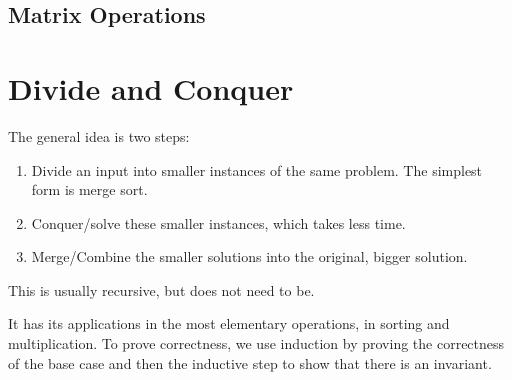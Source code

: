 \documentclass{article}
\begin{document}
  \subsection{Matrix Operations}

    \begin{definition}
      
    \end{definition}

    \begin{definition}
      
    \end{definition}

    \begin{definition}[QR Decomposition]
      
    \end{definition}

    \begin{definition}[LU Decomposition]
      
    \end{definition}

    \begin{definition}
      
    \end{definition}

\section{Divide and Conquer} 

  \begin{definition}
    The general idea is two steps: 
    \begin{enumerate}
      \item Divide an input into smaller instances of the same problem. The simplest form is merge sort. 
      \item Conquer/solve these smaller instances, which takes less time. 
      \item Merge/Combine the smaller solutions into the original, bigger solution. 
    \end{enumerate}
    This is usually recursive, but does not need to be. 
  \end{definition}

  It has its applications in the most elementary operations, in sorting and multiplication. To prove correctness, we use induction by proving the correctness of the base case and then the inductive step to show that there is an invariant. 
\end{document}
